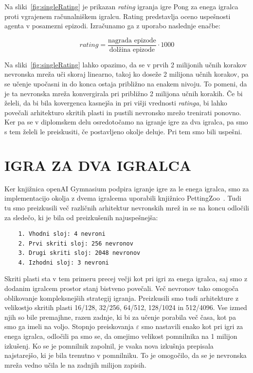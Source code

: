 \documentclass[cover]{thesis}
\begin{document}
Na sliki~\ref{fig:singleRating} je prikazan \emph{rating} igranja igre Pong za enega igralca proti vgrajenem računalniškem igralcu. Rating predstavlja oceno uspešnosti agenta v posamezni epizodi. Izračunamo ga z uporabo naslednje enačbe:

\begin{equation}\label{eq:rating}
    rating = \frac{\text{nagrada epizode}}{\text{dolžina epizode}} \cdot 1000
\end{equation}

Na sliki~\ref{fig:singleRating} lahko opazimo, da se v prvih 2 milijonih učnih korakov nevronska mreža uči skoraj linearno, takoj ko doseže 2 milijona učnih korakov, pa se učenje upočasni in do konca ostaja približno na enakem nivoju. To pomeni, da je ta nevronska mreža konvergirala pri približno 2 milijona učnih korakih. Če bi želeli, da bi bila kovergenca kasnejša in pri višji vrednosti \emph{ratinga}, bi lahko povečali arhitekturo skritih plasti in pustili nevronsko mrežo trenirati ponovno. Ker pa se v diplomskem delu osredotočamo na igranje igre za dva igralca, pa smo s tem želeli le preiskusiti, če postavljeno okolje deluje. Pri tem smo bili uspešni.

\section{IGRA ZA DVA IGRALCA}

Ker knjižnica openAI Gymnasium podpira igranje igre za le enega igralca, smo za implementacijo okolja z dvema igralcema uporabili knjižnico PettingZoo~\cite{Terry_PettingZoo_Gym_for}. Tudi tu smo preizkusili več različnih arhitektur nevronskih mrež in se na koncu odločili za sledečo, ki je bila od preizkušenih najuspešnejša:
\begin{verbatim}
    1. Vhodni sloj: 4 nevroni
    2. Prvi skriti sloj: 256 nevronov
    3. Drugi skriti sloj: 2048 nevronov
    4. Izhodni sloj: 3 nevroni
\end{verbatim}
Skriti plasti sta v tem primeru precej večji kot pri igri za enega igralca, saj smo z dodanim igralcem prostor stanj bistveno povečali. Več nevronov tako omogoča oblikovanje kompleksnejših strategij igranja. Preizkusili smo tudi arhitekture z velikostjo skritih plasti 16/128, 32/256, 64/512, 128/1024 in 512/4096. Vse izmed njih so bile premajhne, razen zadnje, ki bi za učenje porabila več časa, kot pa smo ga imeli na voljo. Stopnjo preiskovanja $\varepsilon$ smo nastavili enako kot pri igri za enega igralca, odločili pa smo se, da omejimo velikost pomnilnika na 1 milijon izkušenj. Ko se je pomnilnik zapolnil, je vsaka nova izkušnja prepisala najstarejšo, ki je bila trenutno v pomnilniku. To je omogočilo, da se je nevronska mreža vedno učila le na zadnjih milijon zapisih.
\end{document}
